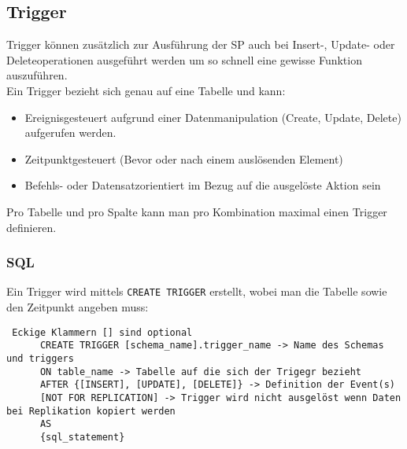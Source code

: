 \documentclass{article}
\begin{document}
	 \subsection{Trigger}
	 Trigger können zusätzlich zur Ausführung der SP auch bei Insert-, Update- oder Deleteoperationen ausgeführt werden um so schnell eine gewisse Funktion auszuführen. \\
	 Ein Trigger bezieht sich genau auf eine Tabelle und kann:
	 \begin{itemize}
	  	\item{Ereignisgesteuert aufgrund einer Datenmanipulation (Create, Update, Delete) aufgerufen werden.}
	  	\item{Zeitpunktgesteuert (Bevor oder nach einem auslösenden Element)}
	  	\item{Befehls- oder Datensatzorientiert im Bezug auf die ausgelöste Aktion sein}
	  \end{itemize} 
	  Pro Tabelle und pro Spalte kann man pro Kombination maximal einen Trigger definieren. \\
	  \subsubsection{SQL}
	  Ein Trigger wird mittels \texttt{CREATE TRIGGER} erstellt, wobei man die Tabelle sowie den Zeitpunkt angeben muss:
	  \begin{verbatim} Eckige Klammern [] sind optional
	  CREATE TRIGGER [schema_name].trigger_name -> Name des Schemas und triggers
	  ON table_name -> Tabelle auf die sich der Trigegr bezieht
	  AFTER {[INSERT], [UPDATE], [DELETE]} -> Definition der Event(s)
	  [NOT FOR REPLICATION] -> Trigger wird nicht ausgelöst wenn Daten bei Replikation kopiert werden
	  AS
	  {sql_statement}
	  \end{verbatim}
	 













	
\end{document}
